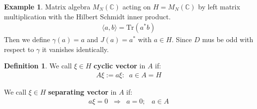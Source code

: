 \documentclass[a4paper]{article}
\theoremstyle{definition}
\newtheorem{definition}{Definition}
\theoremstyle{definition}
\theoremstyle{definition}
\newtheorem{example}{Example}
\theoremstyle{theorem}
\theoremstyle{theorem}
\begin{document}
\begin{example}
    Matrix algebra $M_N(\mathbb{C})$ acting on $H=M_N(\mathbb{C})$ by left
    matrix multiplication with the Hilbert Schmidt inner product.
    \begin{align}
        \langle a , b \rangle = \text{Tr}(a^* b)
    \end{align}
    Then we define $\gamma (a) = a$ and $J(a) = a^*$ with $a\in H$.
    Since $D$ mus be odd with respect to $\gamma$ it vanishes identically.
\end{example}

\begin{definition}
    We call $\xi \in H$ \textbf{cyclic vector} in $A$ if:
    \begin{align}
        A\xi := { a\xi:\;\; a\in A} = H
    \end{align}

    We call $\xi \in H$ \textbf{separating vector} in $A$ if:
    \begin{align}
        a\xi = 0\;\; \Rightarrow \;\; a=0;\;\;\; a\in A
    \end{align}
\end{definition}
\end{document}
